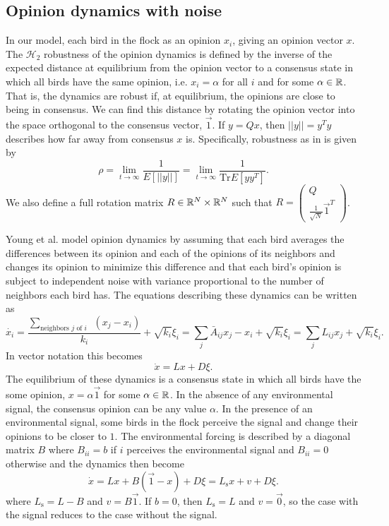 \documentclass{article}
\DeclareRobustCommand{\cite}[1]{\citep{#1}}
\newcommand{\Tr}{\text{Tr}}
\begin{document}
\subsection{Opinion dynamics with noise }
In our model, each bird in the flock as an opinion $x_i$, giving an opinion vector $x$. The $\mathscr{H}_2$ robustness of the opinion dynamics is defined by the inverse of the expected distance at equilibrium from the opinion vector to a consensus state in which all birds have the same opinion, i.e. $x_i=\alpha$ for all $i$ and for some $\alpha\in{\mathbb{R}}$. That is, the dynamics are robust if, at equilibrium, the opinions are close to being in consensus. We can find this distance by rotating the opinion vector into the space orthogonal to the consensus vector, $\vec{1}$.  If $y=Qx$, then $||y||=y^Ty$ describes how far away from consensus $x$ is. Specifically, robustness as in \cite{Young:2010fk} is given by 
\begin{equation}
\rho=\lim_{t\to\infty}\frac{1}{E[||y||]}=\lim_{t\to\infty}\frac{1}{\Tr E[yy^T]}. \label{H2_robustness}
\end{equation}
We also define a full rotation matrix $R\in{\mathbb{R}}^N\times{\mathbb{R}}^N$ such that $R=\left(\begin{array}{cc} Q \\ \frac{1}{\sqrt{N}}\vec{1}^T \end{array}\right)$.

Young et al. \cite{Young:2010fk} model opinion dynamics by assuming that each bird averages the differences between its opinion and each of the opinions of its neighbors and changes its opinion to minimize this difference and that each bird's opinion is subject to independent noise with variance proportional to the number of neighbors each bird has. The equations describing these dynamics can be written as 
\begin{equation}
\dot{x_i}=\frac{\sum_{\text{neighbors $j$ of $i$ } }(x_j-x_i)}{k_i} +\sqrt{k_i}\xi_i=\sum_j\bar{A}_{ij}x_j-x_i+\sqrt{k_i}\xi_i=\sum_jL_{ij}x_j+\sqrt{k_i}\xi_i.
\end{equation}
In vector notation this becomes
\begin{equation}
\dot{x}=Lx+D\xi.
\end{equation}
The equilibrium of these dynamics is a consensus state in which all birds have the some opinion, $x=\alpha\vec{1}$ for some $\alpha\in{\mathbb{R}}$. In the absence of any environmental signal, the consensus opinion can be any value $\alpha$. In the presence of an environmental signal, some birds in the flock perceive the signal and change their opinions to be closer to $1$. The environmental forcing is described by a diagonal matrix $B$ where $B_{ii}=b$ if $i$ perceives the environmental signal and $B_{ii}=0$ otherwise and the dynamics then become
\begin{equation}
\dot{x}=Lx+B(\vec{1}-x)+D\xi=L_\text{s}x+v+D\xi.
\end{equation}
where $L_\text{s}=L-B$ and $v=B\vec{1}$. If $b=0$, then $L_\text{s}=L$ and $v=\vec{0}$, so the case with the signal reduces to the case without the signal. 
\end{document}
